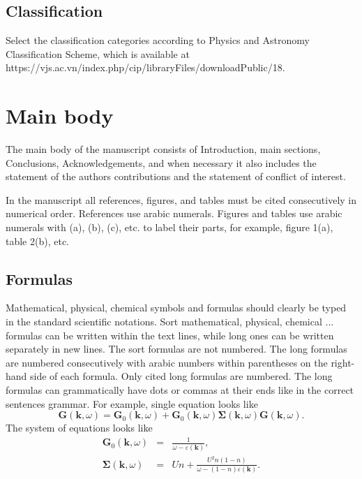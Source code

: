 \documentclass[a4,11pt]{cip-v3-cls-submit}
\begin{document}
\subsection{Classification}
Select the classification categories according to Physics and Astronomy Classification Scheme, which is
available at https://vjs.ac.vn/index.php/cip/libraryFiles/downloadPublic/18.


\section{Main body}
The main body of the manuscript consists of Introduction, main sections, Conclusions, Acknowledgements,
and when necessary it also includes the statement of the authors contributions and the statement of conflict of interest.

In the manuscript all references, figures, and tables must be cited consecutively in numerical order.
References use arabic numerals.
Figures and tables use arabic numerals with (a), (b), (c), etc. to label their parts, for example,
figure 1(a), table 2(b), etc.


\subsection{Formulas}
Mathematical, physical, chemical symbols and formulas should clearly be typed in the standard scientific notations.
Sort mathematical, physical, chemical ... formulas can be written within the text lines, while
long ones can be written separately in new lines. The sort formulas are not numbered. The long formulas
are numbered consecutively with arabic numbers within parentheses on the right-hand side of each formula. Only cited long formulas are numbered. The long formulas can grammatically have dots or commas at their ends like in the correct sentences grammar. For example, single equation looks like
\begin{equation}
\mathbf{G}(\mathbf{k},\omega)=\mathbf{G}_0(\mathbf{k},\omega)+
\mathbf{G}_0(\mathbf{k},\omega) \boldsymbol{\Sigma}(\mathbf{k},\omega) \mathbf{G}(\mathbf{k},\omega) .
\end{equation}
The system of equations looks like
\begin{eqnarray}
\mathbf{G}_0(\mathbf{k},\omega) &=& \frac{1}{\omega-\varepsilon(\mathbf{k})} , \\
\boldsymbol{\Sigma}(\mathbf{k},\omega) &=& U n + \frac{U^2 n(1-n)}{\omega-(1-n)\varepsilon(\mathbf{k})} .
\end{eqnarray}
\end{document}
